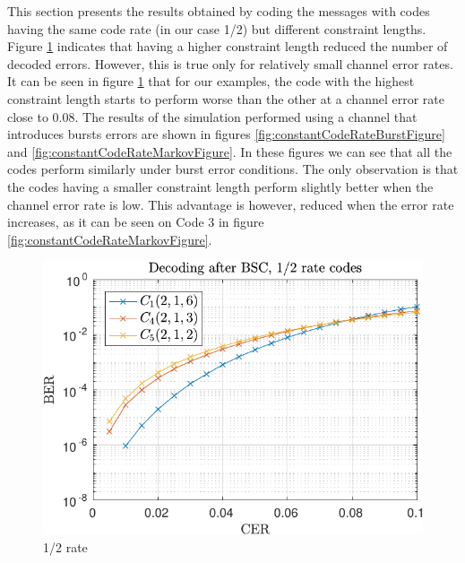 This section presents the results obtained by coding the messages with codes having the same code rate (in our case 1/2) but different constraint lengths. Figure \ref{fig:constantCodeRateRandomFigure} indicates that having a higher constraint length reduced the number of decoded errors. However, this is true only for relatively small channel error rates. It can be seen in figure \ref{fig:constantCodeRateRandomFigure} that for our examples, the code with the highest constraint length starts to perform worse than the other at a channel error rate close to 0.08. 
The results of the simulation performed using a channel that introduces bursts errors are shown in figures \ref{fig:constantCodeRateBurstFigure} and \ref{fig:constantCodeRateMarkovFigure}. In these figures we can see that all the codes perform similarly under burst error conditions. The only observation is that the codes having a smaller constraint length perform slightly better when the channel error rate is low. This advantage is however, reduced when the error rate increases, as it can be seen on Code 3 in figure \ref{fig:constantCodeRateMarkovFigure}.


\begin{figure}
\centering
\includegraphics[scale=1]{../figures/extra12rand.pdf} 
\caption{1/2 rate\label{fig:constantCodeRateRandomFigure}}
\end{figure}

